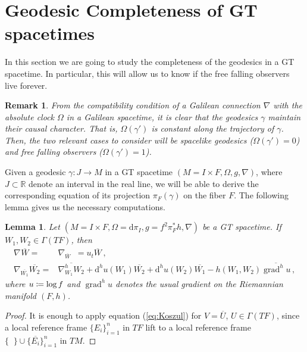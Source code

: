 \documentclass[12pt]{article}
\newcommand{\diff}{\mathrm{d}}
\newcommand{\coloneq}{\vcentcolon\mathrel{\mkern -1.2mu}\mathrel{=}}
\DeclareMathOperator{\pt}{\partial_t}
\DeclareMathOperator{\grad}{grad}
\newtheorem{lem}[defi]{Lemma}
\newtheorem{rem}[defi]{Remark}
\def\R{\mathbb R}
\begin{document}
\section{Geodesic Completeness of GT spacetimes}\label{sect4}

In this section we are going to study the completeness of the geodesics in a GT spacetime. In particular, this will allow us to know if the free falling observers live forever.

\begin{rem}
\emph{
    From the compatibility condition of a Galilean connection $\nabla$ with the absolute clock $\Omega$ in a Galilean spacetime, it is clear that the geodesics $\gamma$ maintain their causal character. That is, $\Omega(\gamma')$ is constant along the trajectory of $\gamma$. Then, the two relevant cases to consider will be spacelike geodesics ($\Omega(\gamma')=0$) and free falling observers ($\Omega(\gamma')=1$).
    }
\end{rem}

Given a geodesic $\gamma: J\longrightarrow M$ in a GT spacetime $(M=I\times F, \Omega, g, \nabla)$, where $J\subset\R$ denote an interval in the real line, we will be able to derive the corresponding equation of its projection  $\pi_F(\gamma)$ on the fiber $F$. The following lemma gives us the necessary computations.
\begin{lem}
    Let $(M=I\times F, \Omega= \diff \pi_I, g=f^2 \pi_F^* h, \nabla)$ be a GT spacetime. If $W_1,W_2\in \Gamma(TF)$, then
    \begin{equation}\label{eq:GT connection}
    \begin{split}
        \nabla_{\pt} \overline{W} ={}& \nabla_{\overline{W}} \pt = u_t \overline{W}\,,\\
        \nabla_{\overline{W_1}} \overline{W_2} ={}& \overline{\nabla^h_{W_1} W_2} + \diff^h u(W_1) \overline{W_2} + \diff^h u(W_2) \overline{W_1} - h(W_1,W_2) \overline{\grad^h u}\,,
    \end{split} 
    \end{equation}
    where $u\coloneq\log f$ and $\grad^h u$ denotes the usual gradient on the Riemannian manifold $(F,h)$.
\end{lem}
\begin{proof}
    It is enough to apply equation (\ref{eq:Koszul}) for $V=\overline{U}$, $U\in \Gamma(TF)$, since a local reference frame $\{E_i\}_{i=1}^n$ in $TF$ lift to a local reference frame $\{\pt\}\cup \{\overline{E_i}\}_{i=1}^n$ in $TM$.
\end{proof}
\end{document}

